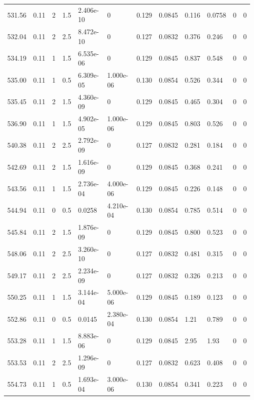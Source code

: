 \documentclass[preview]{standalone}
\begin{document}
{{{{{{{{{\begin{tabular}{L{1.2cm}C{1.2cm} C{0.3cm}C{0.5cm} C{1.4cm}C{1.4cm} C{1.4cm}C{1.4cm} C{1.6cm}C{1.6cm} C{1.6cm}C{1.6cm}}
  531.56  &  0.11  & 2     & 1.5 &  2.406e-10  & 0  &  0.129&   0.0845& 0.116 & 0.0758   &  0 & 0  \\ 
  532.04  &  0.11  & 2     & 2.5 &  8.472e-10  & 0  &  0.127&   0.0832& 0.376 & 0.246   &  0 & 0  \\ 
  534.19  &  0.11  & 1     & 1.5 &  6.535e-06  & 0  &  0.129&   0.0845& 0.837 & 0.548   &  0 & 0  \\ 
  535.00  &  0.11  & 1     & 0.5 &  6.309e-05  & 1.000e-06  &  0.130&   0.0854& 0.526 & 0.344   &  0 & 0  \\ 
  535.45  &  0.11  & 2     & 1.5 &  4.360e-09  & 0  &  0.129&   0.0845& 0.465 & 0.304   &  0 & 0  \\ 
  536.90  &  0.11  & 1     & 1.5 &  4.902e-05  & 1.000e-06  &  0.129&   0.0845& 0.803 & 0.526   &  0 & 0  \\ 
  540.38  &  0.11  & 2     & 2.5 &  2.792e-09  & 0  &  0.127&   0.0832& 0.281 & 0.184   &  0 & 0  \\ 
  542.69  &  0.11  & 2     & 1.5 &  1.616e-09  & 0  &  0.129&   0.0845& 0.368 & 0.241   &  0 & 0  \\ 
  543.56  &  0.11  & 1     & 1.5 &  2.736e-04  & 4.000e-06  &  0.129&   0.0845& 0.226 & 0.148   &  0 & 0  \\ 
  544.94  &  0.11  & 0     & 0.5 &  0.0258  & 4.210e-04  &  0.130&   0.0854& 0.785 & 0.514   &  0 & 0  \\ 
  545.84  &  0.11  & 2     & 1.5 &  1.876e-09  & 0  &  0.129&   0.0845& 0.800 & 0.523   &  0 & 0  \\ 
  548.06  &  0.11  & 2     & 2.5 &  3.260e-10  & 0  &  0.127&   0.0832& 0.481 & 0.315   &  0 & 0  \\ 
  549.17  &  0.11  & 2     & 2.5 &  2.234e-09  & 0  &  0.127&   0.0832& 0.326 & 0.213   &  0 & 0  \\ 
  550.25  &  0.11  & 1     & 1.5 &  3.144e-04  & 5.000e-06  &  0.129&   0.0845& 0.189 & 0.123   &  0 & 0  \\ 
  552.86  &  0.11  & 0     & 0.5 &  0.0145  & 2.380e-04  &  0.130&   0.0854& 1.21 & 0.789   &  0 & 0  \\ 
  553.28  &  0.11  & 1     & 1.5 &  8.883e-06  & 0  &  0.129&   0.0845& 2.95 & 1.93   &  0 & 0  \\ 
  553.53  &  0.11  & 2     & 2.5 &  1.296e-09  & 0  &  0.127&   0.0832& 0.623 & 0.408   &  0 & 0  \\ 
  554.73  &  0.11  & 1     & 0.5 &  1.693e-04  & 3.000e-06  &  0.130&   0.0854& 0.341 & 0.223   &  0 & 0  \\ 

\end{tabular}}}}}}}}}}
\end{document}
